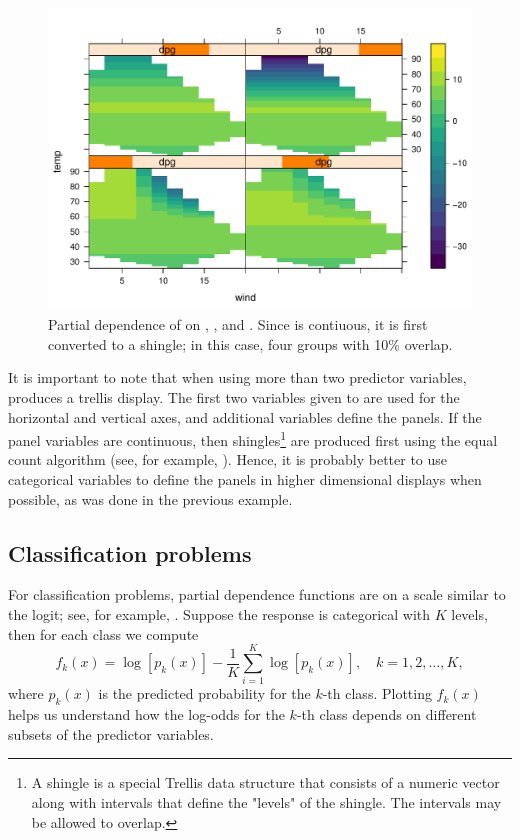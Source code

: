 \begin{figure}[htbp]
  \centering
  \includegraphics[width=0.8\linewidth]{partial_par}
  \caption{Partial dependence of  on , , and . Since  is contiuous, it is first converted to a shingle; in this case, four groups with 10\% overlap.}
  \label{fig:partial_par}
\end{figure}

It is important to note that when using more than two predictor variables,  produces a trellis display. The first two variables given to  are used for the horizontal and vertical axes, and additional variables define the panels. If the panel variables are continuous, then shingles\footnote{A shingle is a special Trellis data structure that consists of a numeric vector along with intervals that define the "levels" of the shingle. The intervals may be allowed to overlap.} are produced first using the equal count algorithm (see, for example, ). Hence, it is probably better to use categorical variables to define the panels in higher dimensional displays when possible, as was done in the previous example.


\subsection{Classification problems}

For classification problems, partial dependence functions are on a scale similar to the logit; see, for example, \citet[pp. 369--370]{hastie-elements-2009}. Suppose the response is categorical with $K$ levels, then for each class we compute
\begin{equation}
\label{eqn:avg-logit}
f_k(x) = \log\left[p_k(x)\right] - \frac{1}{K}\sum_{i = 1}^K\log\left[p_k(x)\right], \quad k = 1, 2, \dots, K,
\end{equation}
where $p_k(x)$ is the predicted probability for the $k$-th class. Plotting $f_k(x)$ helps us understand how the log-odds for the $k$-th class depends on different subsets of the predictor variables.

